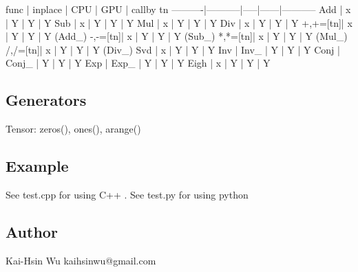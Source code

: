\begin{DoxyVerb}  func    |   inplace | CPU | GPU  | callby tn 
----------|-----------|-----|------|-----------
  Add     |   x       |  Y  |  Y   |    Y
  Sub     |   x       |  Y  |  Y   |    Y
  Mul     |   x       |  Y  |  Y   |    Y
  Div     |   x       |  Y  |  Y   |    Y
  +,+=[tn]|   x       |  Y  |  Y   |    Y (Add_)
  -,-=[tn]|   x       |  Y  |  Y   |    Y (Sub_)
  *,*=[tn]|   x       |  Y  |  Y   |    Y (Mul_)
  /,/=[tn]|   x       |  Y  |  Y   |    Y (Div_)
  Svd     |   x       |  Y  |  Y   |    Y
  Inv     |   Inv_    |  Y  |  Y   |    Y
  Conj    |   Conj_   |  Y  |  Y   |    Y 
  Exp     |   Exp_    |  Y  |  Y   |    Y
  Eigh    |   x       |  Y  |  Y   |    Y 
\end{DoxyVerb}


\subsection*{Generators}

\begin{DoxyVerb}Tensor: zeros(), ones(), arange()
\end{DoxyVerb}


\subsection*{Example}

\begin{DoxyVerb}See test.cpp for using C++ .
See test.py for using python  
\end{DoxyVerb}


\subsection*{Author}

\begin{DoxyVerb}Kai-Hsin Wu kaihsinwu@gmail.com \end{DoxyVerb}
 